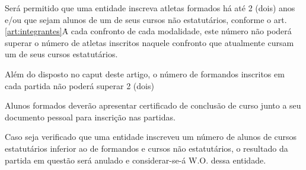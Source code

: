 \begin{article}
	Será permitido que uma entidade inscreva atletas formados há até 2 (dois) anos e/ou que sejam alunos de um de seus cursos não estatutários, conforme o art. \ref{art:integrantes}\ulo\. A cada confronto de cada modalidade, este número não poderá superar o número de atletas inscritos naquele confronto que atualmente cursam um de seus cursos estatutários.

	\begin{xparagraph}
		Além do disposto no caput deste artigo, o número de formandos inscritos em cada partida não poderá superar 2 (dois)
	\end{xparagraph}

	\begin{xparagraph}
		Alunos formados deverão apresentar certificado de conclusão de curso junto a seu documento pessoal para inscrição nas partidas.
	\end{xparagraph}

	\begin{xparagraph}
		Caso seja verificado que uma entidade inscreveu um número de alunos de cursos estatutários inferior ao de formandos e cursos não estatutários, o resultado da partida em questão será anulado e considerar-se-á W.O. dessa entidade.
	\end{xparagraph}
\end{article}
